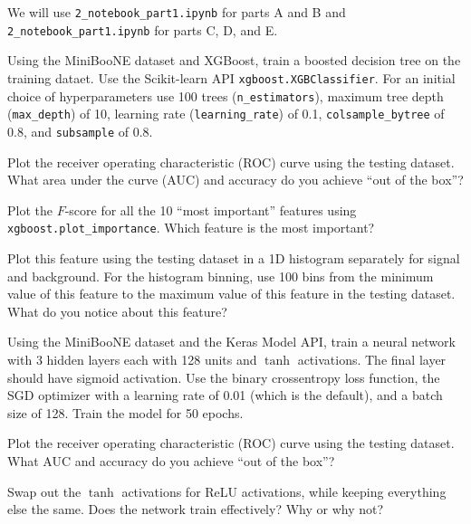 We will use \texttt{2_notebook_part1.ipynb} for parts A and B and \texttt{2_notebook_part1.ipynb} for parts C, D, and E.

\begin{problem}[15]
Using the MiniBooNE dataset and XGBoost, train a boosted decision tree on the training dataet.
Use the Scikit-learn API \texttt{xgboost.XGBClassifier}.
For an initial choice of hyperparameters use 100 trees (\texttt{n_estimators}), maximum tree depth (\texttt{max_depth}) of 10, learning rate (\texttt{learning_rate}) of 0.1, \texttt{colsample_bytree} of 0.8, and \texttt{subsample} of 0.8.

Plot the receiver operating characteristic (ROC) curve using the testing dataset.
What area under the curve (AUC) and accuracy do you achieve ``out of the box''?
\end{problem}


\begin{problem}[5]
Plot the $F$-score for all the 10 ``most important'' features using \texttt{xgboost.plot_importance}.
Which feature is the most important?

Plot this feature using the testing dataset in a 1D histogram separately for signal and background.
For the histogram binning, use 100 bins from the minimum value of this feature to the maximum value of this feature in the testing dataset.
What do you notice about this feature?
\end{problem}


\begin{problem}[15]
Using the MiniBooNE dataset and the Keras Model API, train a neural network with 3 hidden layers each with 128 units and $\tanh$ activations.
The final layer should have sigmoid activation.
Use the binary crossentropy loss function, the SGD optimizer with a learning rate of 0.01 (which is the default), and a batch size of 128.
Train the model for 50 epochs.

Plot the receiver operating characteristic (ROC) curve using the testing dataset.
What AUC and accuracy do you achieve ``out of the box''?
\end{problem}


\begin{problem}[5]
Swap out the $\tanh$ activations for ReLU activations, while keeping everything else the same.
Does the network train effectively?
Why or why not?
\end{problem}

